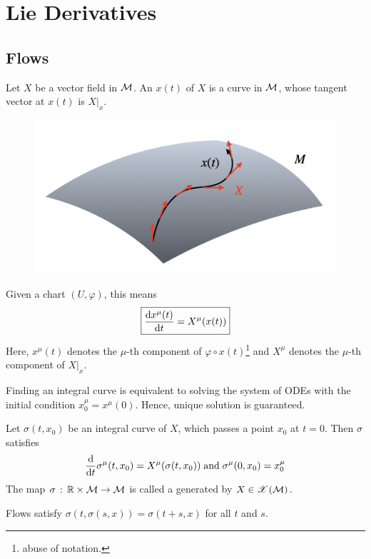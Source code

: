 \documentclass[a4paper, 10pt]{article}
\begin{document}
\setcounter{section}{5}
\section{Lie Derivatives}

\subsection{Flows}

\begin{definition}
    Let $X$ be a vector field in $\mathcal{M}$. An  $x(t)$ of $X$ is a curve in $\mathcal{M}$, whose tangent vector at $x(t)$ is $X|_{x}$.

    \begin{figure}[htbp]
        \centering
        \includegraphics[width=0.5\linewidth]{../images/lecture07/7_01.png}
    \end{figure}

    Given a chart $(U,\varphi)$, this means
    \[ \boxed{\frac{\mathrm{d}{x}^{\mu}(t)}{\mathrm{d}{t}} = X^{\mu}(x(t))} \]
    Here, $x^{\mu}(t)$ denotes the $\mu$-th component of $\varphi\circ x(t)$\footnote{abuse of notation.} and $X^{\mu}$ denotes the $\mu$-th component of $X|_{x}$.
\end{definition}

\begin{remark}
    Finding an integral curve is equivalent to solving the system of ODEs with the initial condition $x_{0}^{\mu} = x^{\mu}(0)$. Hence, unique solution is guaranteed.
\end{remark}

\begin{definition}[Flows]
    Let $\sigma(t, x_{0})$ be an integral curve of $X$, which passes a point $x_{0}$ at $t = 0$. Then $\sigma$ satisfies
    \[ \frac{\mathrm{d}}{\mathrm{d}{t}}\sigma^{\mu}(t,x_{0}) = X^{\mu}(\sigma(t,x_{0})) \;\text{and}\; \sigma^{\mu}(0,x_{0}) = x_{0}^{\mu} \]
    The map $\sigma \,:\, \mathbb{R} \times \mathcal{M} \rightarrow \mathcal{M}$ is called a  generated by $X \in \mathscr{X}(\mathcal{M})$.
\end{definition}

\begin{remark}
    Flows satisfy $\sigma(t, \sigma(s, x)) = \sigma(t + s, x)$ for all $t$ and $s$.
\end{remark}
\end{document}
